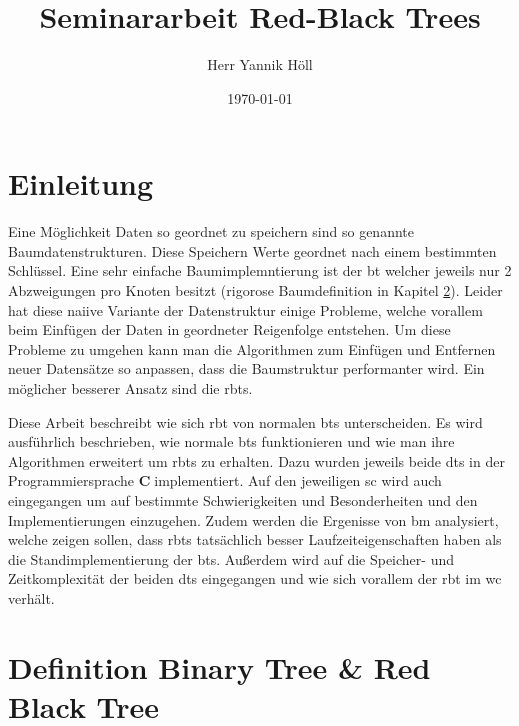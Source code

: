 \documentclass[11pt]{article}
\title{\textbf{Seminararbeit Red-Black Trees}}
\author{Herr Yannik Höll}
\date{\today}
\newcommand{\cpl}{\textbf{C}$\;$}
\begin{document}
\begin{titlingpage}
    \maketitle
\end{titlingpage}
\pagebreak

\tableofcontents
\pagebreak

\glsaddall
\printglossary 
\pagebreak

\section{Einleitung}


Eine Möglichkeit Daten so geordnet zu speichern sind so genannte Baumdatenstrukturen. Diese Speichern Werte geordnet nach einem bestimmten Schlüssel. 
Eine sehr einfache Baumimplemntierung ist der \gls{bt} welcher jeweils nur 2 Abzweigungen pro Knoten besitzt (rigorose Baumdefinition in Kapitel \ref{def}).
Leider hat diese naiive Variante der Datenstruktur einige Probleme, welche vorallem beim Einfügen der Daten in geordneter Reigenfolge entstehen.
Um diese Probleme zu umgehen kann man die Algorithmen zum Einfügen und Entfernen neuer Datensätze so anpassen, dass die Baumstruktur performanter wird.
Ein möglicher besserer Ansatz sind die \glspl{rbt}.   

Diese Arbeit beschreibt wie sich \gls{rbt} von normalen \glspl{bt} unterscheiden. Es wird ausführlich beschrieben, wie normale \glspl{bt} funktionieren und wie man 
ihre Algorithmen erweitert um \glspl{rbt} zu erhalten.
Dazu wurden jeweils beide \glspl{dt} in der Programmiersprache \cpl implementiert. Auf den jeweiligen \gls{sc} wird auch eingegangen um auf bestimmte Schwierigkeiten und Besonderheiten und den Implementierungen einzugehen.
Zudem werden die Ergenisse von \gls{bm} analysiert, welche zeigen sollen, dass \glspl{rbt} tatsächlich besser Laufzeiteigenschaften haben als
die Standimplementierung der \glspl{bt}.
Außerdem wird auf die Speicher- und Zeitkomplexität der beiden \glspl{dt} eingegangen und wie sich vorallem der \gls{rbt} im \gls{wc} verhält. 


\pagebreak

\section{Definition Binary Tree \& Red Black Tree} \label{def}
\pagebreak
\end{document}
